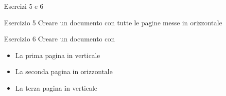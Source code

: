 \begin{frame}{Esercizi 5 e 6}

\begin{block}{Esercizio 5}
Creare un documento con tutte le pagine messe in orizzontale
\end{block}

\vfill

\begin{block}{Esercizio 6}
Creare un documento con 
\begin{itemize}
	\item La prima pagina in verticale
	\item La seconda pagina in orizzontale
	\item La terza pagina in verticale
\end{itemize}
\end{block}

\end{frame}

